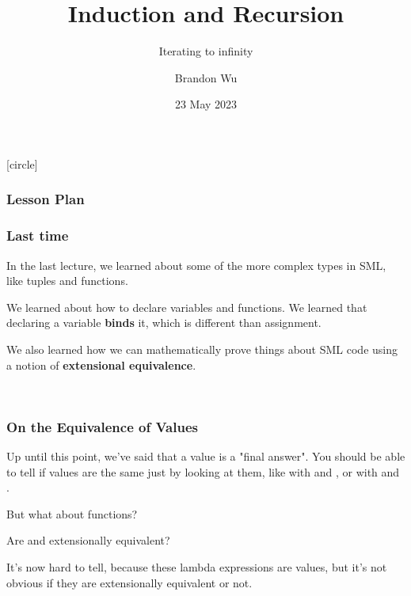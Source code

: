 \documentclass[aspectratio=169]{beamer}
\title{Induction and Recursion} %
\subtitle{Iterating to infinity} %
\date{23 May 2023} %
\author{Brandon Wu} %
\newif\ifcolorlambda
\begin{document}
\ifweb
    \renewcommand{\pause}{}
\fi

[circle]

{
\begin{frame}[plain]
    \colorlambdatrue
    \titlepage
\end{frame}
}

\begin{frame}[fragile]
  \frametitle{Lesson Plan}

  \tableofcontents
\end{frame}

\begin{frame}[fragile]
  \frametitle{Last time}

  In the last lecture, we learned about some of the more complex types in 
  SML, like tuples and functions. 

  \vspace{\fill}
  
  We learned about how to declare variables and functions. We learned that declaring
  a variable \textbf{binds} it, which is different than assignment. 
  
  \vspace{\fill}

  We also learned how we can mathematically prove things 
  about SML code using a notion of \textbf{extensional equivalence}. 
\end{frame}

\begin{frame}[plain]
  \begin{center}
    \huge \color{presentColor}  \\ 
    \vspace{10pt}
    \large \color{presentColor} 
  \end{center}
\end{frame}

\begin{frame}[fragile]
  \frametitle{On the Equivalence of Values}

  Up until this point, we've said that a value is a "final answer". You should be able
  to tell if values are the same just by looking at them, like with  and ,
  or with  and .

  \vspace{\fill}

  But what about functions?

  \pause
  \vspace{5pt}

  Are  and  extensionally equivalent?

  \pause
  \vspace{\fill}

  It's now hard to tell, because these lambda expressions are values, but it's not obvious 
  if they are extensionally equivalent or not.
\end{frame}
\end{document}
